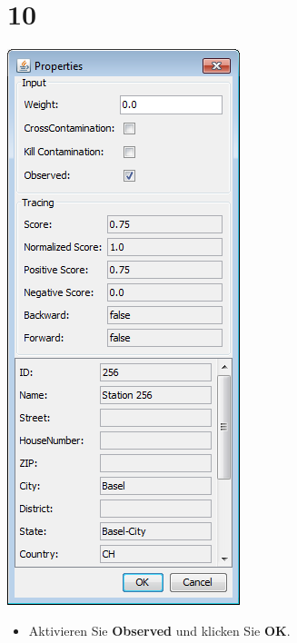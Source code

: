 \documentclass{beamer}
\begin{document}
\section{10}
\begin{frame}
	\begin{center}
  		\includegraphics[height=0.6\textheight]{10.png}
	\end{center}
	\begin{itemize}
		\item Aktivieren Sie \textbf{Observed} und klicken Sie \textbf{OK}.
	\end{itemize}
\end{frame}
\end{document}
